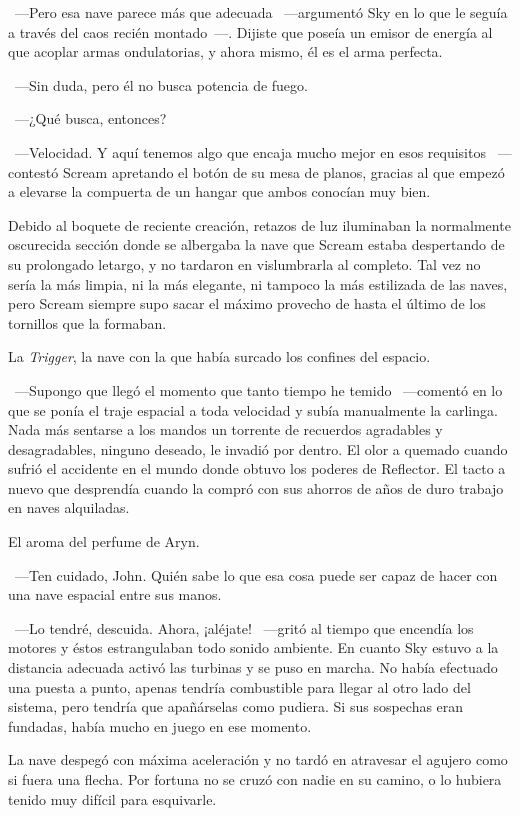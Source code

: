 ~---Pero esa nave parece más que adecuada ~---argumentó Sky en lo que le seguía a través del caos recién montado~---. Dijiste que poseía un emisor de energía al que acoplar armas ondulatorias, y ahora mismo, él es el arma perfecta.

~---Sin duda, pero él no busca potencia de fuego.

~---¿Qué busca, entonces?

~---Velocidad. Y aquí tenemos algo que encaja mucho mejor en esos requisitos ~---contestó Scream apretando el botón de su mesa de planos, gracias al que empezó a elevarse la compuerta de un hangar que ambos conocían muy bien.

Debido al boquete de reciente creación, retazos de luz iluminaban la normalmente oscurecida sección donde se albergaba la nave que Scream estaba despertando de su prolongado letargo, y no tardaron en vislumbrarla al completo. Tal vez no sería la más limpia, ni la más elegante, ni tampoco la más estilizada de las naves, pero Scream siempre supo sacar el máximo provecho de hasta el último de los tornillos que la formaban.

La \emph{Trigger}, la nave con la que había surcado los confines del espacio.

~---Supongo que llegó el momento que tanto tiempo he temido ~---comentó en lo que se ponía el traje espacial a toda velocidad y subía manualmente la carlinga. Nada más sentarse a los mandos un torrente de recuerdos agradables y desagradables, ninguno deseado, le invadió por dentro. El olor a quemado cuando sufrió el accidente en el mundo donde obtuvo los poderes de Reflector. El tacto a nuevo que desprendía cuando la compró con sus ahorros de años de duro trabajo en naves alquiladas.

El aroma del perfume de Aryn.

~---Ten cuidado, John. Quién sabe lo que esa cosa puede ser capaz de hacer con una nave espacial entre sus manos.

~---Lo tendré, descuida. Ahora, ¡aléjate! ~---gritó al tiempo que encendía los motores y éstos estrangulaban todo sonido ambiente. En cuanto Sky estuvo a la distancia adecuada activó las turbinas y se puso en marcha. No había efectuado una puesta a punto, apenas tendría combustible para llegar al otro lado del sistema, pero tendría que apañárselas como pudiera. Si sus sospechas eran fundadas, había mucho en juego en ese momento.

La nave despegó con máxima aceleración y no tardó en atravesar el agujero como si fuera una flecha. Por fortuna no se cruzó con nadie en su camino, o lo hubiera tenido muy difícil para esquivarle.

